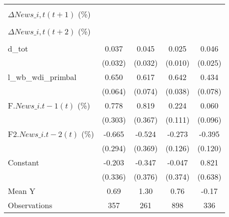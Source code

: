 {\begin{tabular}{l*{4}{c}}
                    &                     &                     &                     &                     \\
\addlinespace
$ \Delta News\_{i,t}(t+1)$ (\%)&                     &                     &                     &                     \\
                    &                     &                     &                     &                     \\
\addlinespace
$ \Delta News\_{i,t}(t+2)$ (\%)&                     &                     &                     &                     \\
                    &                     &                     &                     &                     \\
\addlinespace
d\_tot               &       0.037         &       0.045         &       0.025\sym{**} &       0.046\sym{*}  \\
                    &     (0.032)         &     (0.032)         &     (0.010)         &     (0.025)         \\
\addlinespace
l\_wb\_wdi\_primbal    &       0.650\sym{***}&       0.617\sym{***}&       0.642\sym{***}&       0.434\sym{***}\\
                    &     (0.064)         &     (0.074)         &     (0.038)         &     (0.078)         \\
\addlinespace
F.$ News\_{i.t-1}(t)$ (\%)&       0.778\sym{**} &       0.819\sym{**} &       0.224\sym{**} &       0.060         \\
                    &     (0.303)         &     (0.367)         &     (0.111)         &     (0.096)         \\
\addlinespace
F2.$ News\_{i.t-2}(t)$ (\%)&      -0.665\sym{**} &      -0.524         &      -0.273\sym{**} &      -0.395\sym{***}\\
                    &     (0.294)         &     (0.369)         &     (0.126)         &     (0.120)         \\
\addlinespace
Constant            &      -0.203         &      -0.347         &      -0.047         &       0.821         \\
                    &     (0.336)         &     (0.376)         &     (0.374)         &     (0.638)         \\
\midrule
Mean Y              &        0.69         &        1.30         &        0.76         &       -0.17         \\
Observations        &         357         &         261         &         898         &         336         \\
\bottomrule
\end{tabular}
}
